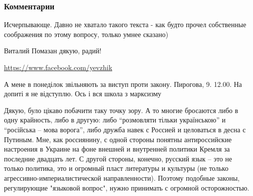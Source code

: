 \subsubsection{Комментарии}


Исчерпывающе. Давно не хватало такого текста - как будто прочел собственные
соображения по этому вопросу, только умнее сказано)


Виталий Помазан дякую, радий!

\url{https://www.facebook.com/yevzhik}

А мене в понеділок звільняють за виступ проти закону. Пирогова, 9. 12.00. На
допиті я не відступлю. Ось і вся школа з марксизму


Дякую, було цікаво побачити таку точку зору. А то многие бросаются либо в одну
крайность, либо в другую: либо \enquote{розмовляти тільки українською} и \enquote{російська –
мова ворога}, либо дружба навек с Россией и целоваться в десна с Путиным. Мне,
как россиянину, с одной стороны понятны антироссийские настроения в Украине на
фоне внешней и внутренней политики Кремля за последние двадцать лет. С другой
стороны, конечно, русский язык – это не только политика, это и огромный пласт
литературы и культуры (не только агрессивно-империалистической направленности).
Поэтому подобные законы, регулирующие "языковой вопрос", нужно принимать с
огромной осторожностью.

